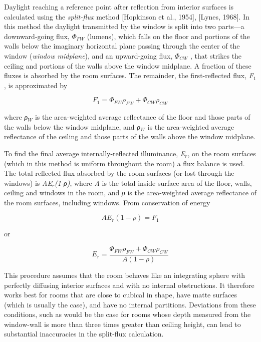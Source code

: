 Daylight reaching a reference point after reflection from interior surfaces is calculated using the \emph{split-flux} method {[}Hopkinson et al., 1954{]}, {[}Lynes, 1968{]}. In this method the daylight transmitted by the window is split into two parts---a downward-going flux, \({\Phi_{FW}}\) (lumens), which falls on the floor and portions of the walls below the imaginary horizontal plane passing through the center of the window (\emph{window midplane}), and an upward-going flux, \({\Phi_{CW}}\) , that strikes the ceiling and portions of the walls above the window midplane. A fraction of these fluxes is absorbed by the room surfaces. The remainder, the first-reflected flux, \emph{F\(_{1}\)}, is approximated by

\begin{equation}
{F_1} = {\Phi_{FW}}{\rho_{FW}} + {\Phi_{CW}}{\rho_{CW}}
\end{equation}

where \emph{ρ\(_{W}\)} is the area-weighted average reflectance of the floor and those parts of the walls below the window midplane, and \emph{ρ\(_{W}\)} is the area-weighted average reflectance of the ceiling and those parts of the walls above the window midplane.

To find the final average internally-reflected illuminance, \emph{E\(_{r}\)}, on the room surfaces (which in this method is uniform throughout the room) a flux balance is used. The total reflected flux absorbed by the room surfaces (or lost through the windows) is \emph{AE\(_{r}\)(1-ρ)}, where \emph{A} is the total inside surface area of the floor, walls, ceiling and windows in the room, and \emph{ρ} is the area-weighted average reflectance of the room surfaces, including windows. From conservation of energy

\begin{equation}
A{E_r}(1 - \rho ) = {F_1}
\end{equation}

or

\begin{equation}
{E_r} = \frac{{{\Phi_{FW}}{\rho_{FW}} + {\Phi_{CW}}{\rho_{CW}}}}{{A(1 - \rho )}}
\end{equation}

This procedure assumes that the room behaves like an integrating sphere with perfectly diffusing interior surfaces and with no internal obstructions. It therefore works best for rooms that are close to cubical in shape, have matte surfaces (which is usually the case), and have no internal partitions. Deviations from these conditions, such as would be the case for rooms whose depth measured from the window-wall is more than three times greater than ceiling height, can lead to substantial inaccuracies in the split-flux calculation.

